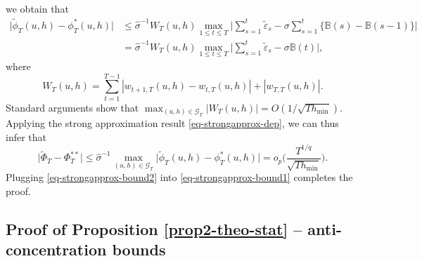 \documentclass[a4paper,12pt]{article}
\numberwithin{equation}{section}
\begin{document}
we obtain that 
\begin{align*}
\big| \widetilde{\phi}_T(u,h) - \phi_T^*(u,h) \big| 
 & \le \widehat{\sigma}^{-1} W_T(u,h) \max_{1 \le t \le T} \Big| \sum\limits_{s=1}^t \widetilde{\varepsilon}_s - \sigma \sum\limits_{s=1}^t \big\{ \mathbb{B}(s) - \mathbb{B}(s-1) \big\} \Big| \\
 & = \widehat{\sigma}^{-1} W_T(u,h) \max_{1 \le t \le T} \Big| \sum\limits_{s=1}^t \widetilde{\varepsilon}_s - \sigma \mathbb{B}(t) \Big|,
\end{align*}
where
\[ W_T(u,h) = \sum\limits_{t=1}^{T-1} |w_{t+1,T}(u,h) - w_{t,T}(u,h)| + |w_{T,T}(u,h)|. \]
Standard arguments show that $\max_{(u,h) \in \mathcal{G}_T} |W_T(u,h)| = O( 1/\sqrt{Th_{\min}} )$. Applying the strong approximation result \eqref{eq-strongapprox-dep}, we can thus infer that 
\begin{equation}\label{eq-strongapprox-bound2}
\big| \widetilde{\Phi}_T - \Phi_T^{**} \big| \le \widehat{\sigma}^{-1} \max_{(u,h) \in \mathcal{G}_T} \big| \widetilde{\phi}_T(u,h) - \phi_T^*(u,h) \big| = o_p \Big( \frac{T^{1/q}}{\sqrt{Th_{\min}}} \Big). 
\end{equation}
Plugging \eqref{eq-strongapprox-bound2} into \eqref{eq-strongapprox-bound1} completes the proof.



\enlargethispage{0.2cm}
\subsection*{Proof of Proposition \ref{prop2-theo-stat} -- anti-concentration bounds}
\end{document}
